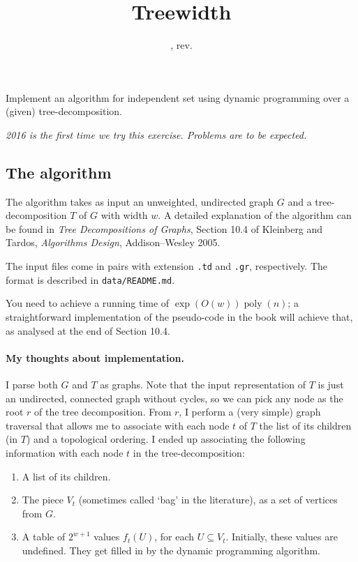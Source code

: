 \documentclass{tufte-handout}
\title{Treewidth}
\date{\GITAuthorDate, rev. \GITAbrHash}
\author{}
\begin{document}
\maketitle

Implement an algorithm for independent set using dynamic programming over a (given) tree-decomposition.

\emph{2016 is the first time we try this exercise. Problems are to be expected.}

\subsection{The algorithm}

The algorithm takes as input an unweighted, undirected graph $G$ and a tree-decomposition $T$ of $G$ with width $w$.
A detailed explanation of the algorithm can be found in \emph{Tree Decompositions of Graphs}, Section 10.4 of Kleinberg and Tardos, \emph{Algorithms Design}, Addison--Wesley 2005.

The input files come in pairs with extension {\tt .td} and {\tt .gr}, respectively.
The format is described in {\tt data/README.md}.


You need to achieve a running time of $\exp(O(w))\operatorname{poly}(n)$; a straightforward implementation of the pseudo-code in the book will achieve that, as analysed at the end of Section 10.4.

\paragraph{My thoughts about implementation.}
I parse both $G$ and $T$ as graphs.
Note that the input representation of $T$ is just an undirected, connected graph without cycles, so we can pick any node as the root $r$ of the tree decomposition.
From $r$, I perform a (very simple) graph traversal that allows me to associate with each node $t$ of $T$ the list of its children (in $T$) and a topological ordering.
I ended up associating the following information with each node $t$ in the tree-decomposition:
\begin{enumerate}
\item A list of its children.
\item The piece $V_t$ (sometimes called `bag' in the literature), as a set of vertices from $G$.
\item A table of $2^{w+1}$ values $f_t(U)$, for each $U\subseteq V_t$. 
  Initially, these values are undefined.
  They get filled in by the dynamic programming algorithm.
\end{enumerate}
\end{document}
